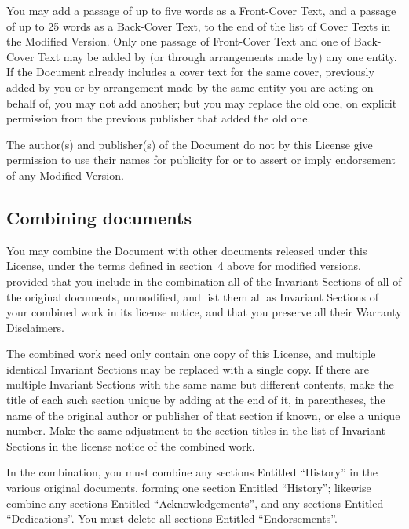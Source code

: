 \documentclass[letterpaper,twoside]{scrartcl}
\begin{document}
   You may add a passage of up to five words as a Front-Cover Text, and a
   passage of up to 25 words as a Back-Cover Text, to the end of the list
   of Cover Texts in the Modified Version.  Only one passage of
   Front-Cover Text and one of Back-Cover Text may be added by (or
   through arrangements made by) any one entity.  If the Document already
   includes a cover text for the same cover, previously added by you or
   by arrangement made by the same entity you are acting on behalf of,
   you may not add another; but you may replace the old one, on explicit
   permission from the previous publisher that added the old one.

   The author(s) and publisher(s) of the Document do not by this License
   give permission to use their names for publicity for or to assert or
   imply endorsement of any Modified Version.


   
   
   \subsection{Combining documents}
   


   You may combine the Document with other documents released under this
   License, under the terms defined in section~4 above for modified
   versions, provided that you include in the combination all of the
   Invariant Sections of all of the original documents, unmodified, and
   list them all as Invariant Sections of your combined work in its
   license notice, and that you preserve all their Warranty Disclaimers.

   The combined work need only contain one copy of this License, and
   multiple identical Invariant Sections may be replaced with a single
   copy.  If there are multiple Invariant Sections with the same name but
   different contents, make the title of each such section unique by
   adding at the end of it, in parentheses, the name of the original
   author or publisher of that section if known, or else a unique number.
   Make the same adjustment to the section titles in the list of
   Invariant Sections in the license notice of the combined work.

   In the combination, you must combine any sections Entitled ``History''
   in the various original documents, forming one section Entitled
   ``History''; likewise combine any sections Entitled ``Acknowledgements'',
   and any sections Entitled ``Dedications''.  You must delete all sections
   Entitled ``Endorsements''.
\end{document}
